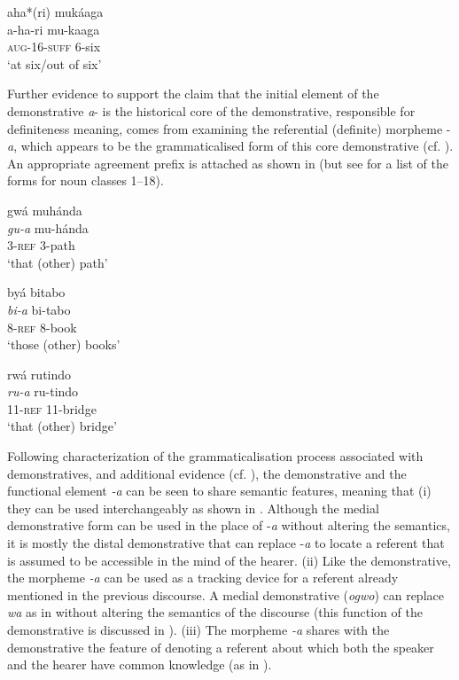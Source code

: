 \documentclass[output=paper 		  ]{langscibook}
\begin{document}
    \ex\label{ex:asiimwe:10d}  aha*(ri) mukáaga\\
  \gll a-ha-ri  mu-kaaga\\
  \textsc{aug-16-suff}  6-six\\
    \glt ‘at six/out of six’
    \z
\z

Further evidence to support the claim that the initial element of the demonstrative \textit{a}{}- is the historical core of the demonstrative, responsible for definiteness meaning, comes from examining the referential (definite) morpheme -\textit{a}, which appears to be the grammaticalised form of this core demonstrative (cf. \citealt{Asiimwe2014,Asiimwe2016}). An appropriate agreement prefix is attached as shown in  (but see \citealt[68]{Asiimwe2016} for a list of the forms for noun classes 1--18).

\newpage
\ea%
    \label{ex:asiimwe:11}
    \ea\label{ex:asiimwe:11a}  gwá muhánda\\
    \gll \emph{gu-a}  mu-hánda\\
    3-\textsc{ref}  3-path\\
    \glt ‘that (other) path’

    \ex\label{ex:asiimwe:11b}  byá bitabo\\
    \gll \emph{bi-a}  bi-tabo \\
    8-\textsc{ref}  8-book\\
    \glt ‘those (other) books’

    \ex\label{ex:asiimwe:11c}  rwá rutindo\\
    \gll     \emph{ru-a}   ru-tindo\\
                11-\textsc{ref}  11-bridge\\
    \glt        ‘that (other) bridge’
    \z
\z

Following  characterization of the grammaticalisation process associated with demonstratives, and additional evidence (cf. \citealt{Asiimwe2014,Asiimwe2016}), the demonstrative and the functional element \textit{{}-a} can be seen to share semantic features, meaning that (i) they can be used interchangeably as shown in . Although the medial demonstrative form can be used in the place of -\textit{a} without altering the semantics, it is mostly the distal demonstrative that can replace -\textit{a} to locate a referent that is assumed to be accessible in the mind of the hearer. (ii) Like the demonstrative, the morpheme \textit{{}-a} can be used as a tracking device for a referent already mentioned in the previous discourse. A medial demonstrative (\textit{ogwo}) can replace \textit{wa} as in  without altering the semantics of the discourse (this function of the demonstrative is discussed in ). (iii) The morpheme \textit{{}-a} shares with the demonstrative the feature of denoting a referent about which both the speaker and the hearer have common knowledge (as in ).
\end{document}
